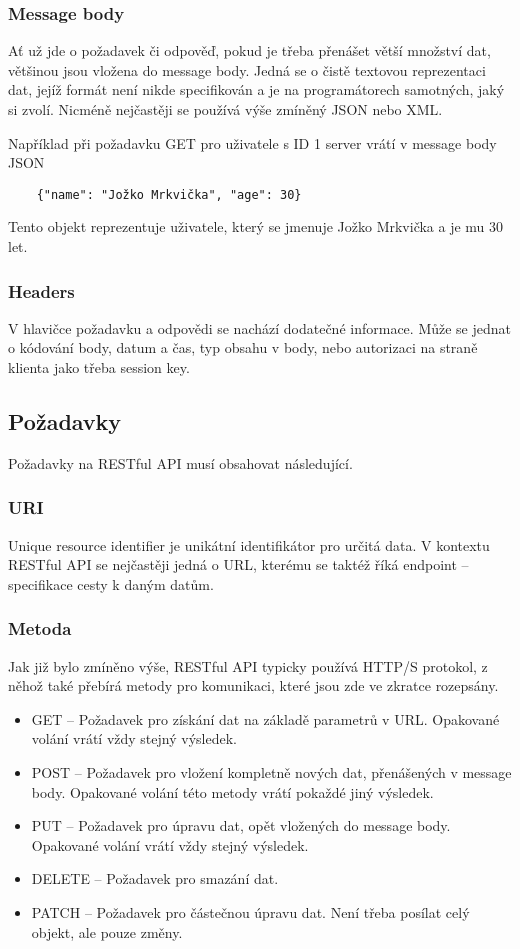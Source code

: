 \subsubsection*{Message body}
Ať už jde o požadavek či odpověď, pokud je třeba přenášet větší množství dat, většinou jsou vložena do message body. Jedná se o čistě textovou reprezentaci dat, jejíž formát není nikde specifikován a je na programátorech samotných, jaký si zvolí. Nicméně nejčastěji se používá výše zmíněný JSON nebo XML.

Například při požadavku GET pro uživatele s ID 1 server vrátí v message body JSON
\begin{verbatim}
	{"name": "Jožko Mrkvička", "age": 30}
\end{verbatim}
Tento objekt reprezentuje uživatele, který se jmenuje Jožko Mrkvička a je mu 30 let.

\subsubsection*{Headers}
V hlavičce požadavku a odpovědi se nachází dodatečné informace. Může se jednat o kódování body, datum a čas, typ obsahu v body, nebo autorizaci na straně klienta jako třeba session key.


\subsection{Požadavky}
Požadavky na RESTful API musí obsahovat následující.

\subsubsection*{URI}
Unique resource identifier je unikátní identifikátor pro určitá data. V kontextu RESTful API se nejčastěji jedná o URL, kterému se taktéž říká endpoint -- specifikace cesty k daným datům.

\subsubsection*{Metoda}
Jak již bylo zmíněno výše, RESTful API typicky používá HTTP/S protokol, z něhož také přebírá metody pro komunikaci, které jsou zde ve zkratce rozepsány.

\begin{itemize}
    \item GET -- Požadavek pro získání dat na základě parametrů v URL. Opakované volání vrátí vždy stejný výsledek.
    \item POST -- Požadavek pro vložení kompletně nových dat, přenášených v message body. Opakované volání této metody vrátí pokaždé jiný výsledek.
    \item PUT -- Požadavek pro úpravu dat, opět vložených do message body. Opakované volání vrátí vždy stejný výsledek.
    \item DELETE -- Požadavek pro smazání dat.
    \item PATCH -- Požadavek pro částečnou úpravu dat. Není třeba posílat celý objekt, ale pouze změny.
\end{itemize}



